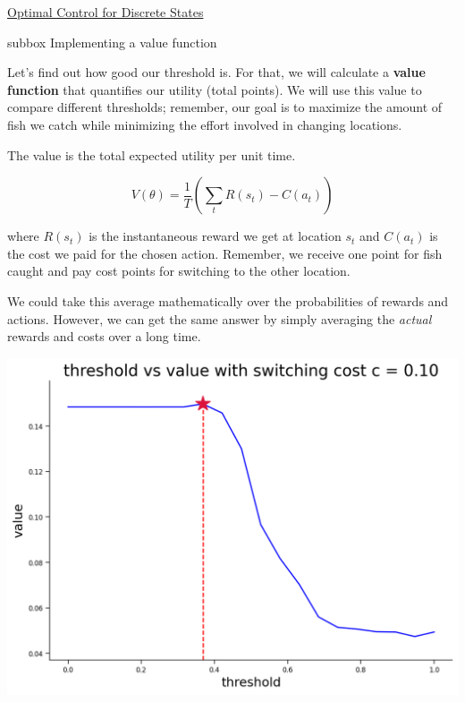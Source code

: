 \begin{textbox}{\href{https://compneuro.neuromatch.io/tutorials/W3D3_OptimalControl/student/W3D3_Tutorial1.html}{Optimal Control for Discrete States }   }
\begin{subbox}{subbox}{ Implementing a value function}
\scriptsize

Let's find out how good our threshold is. For that, we will calculate a \textbf{value function} that quantifies our utility (total points). We will use this value to compare different thresholds; remember, our goal is to maximize the amount of fish we catch while minimizing the effort involved in changing locations.

The value is the total expected utility per unit time.

\begin{equation}
V(\theta) = \frac{1}{T}\left( \sum_t R(s_t) - C(a_t) \right)
\end{equation}

where $R(s_t)$ is the instantaneous reward we get at location $s_t$ and $C(a_t)$ is the cost we paid for the chosen action. Remember, we receive one point for fish caught and pay cost points for switching to the other location. 

We could take this average mathematically over the probabilities of rewards and actions. However, we can get the same answer by simply averaging the \textit{actual} rewards and costs over a long time.


\begin{center}
    
\includegraphics[scale=0.15]{Figures/OC/OC_Figure5.png}
\end{center}


\end{subbox}
\end{textbox}
